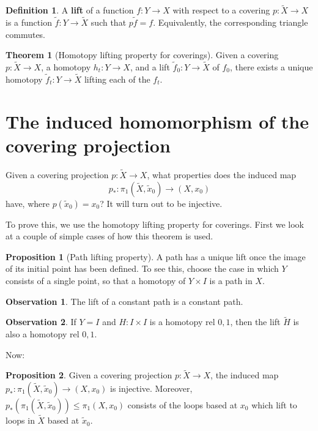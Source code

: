 \documentclass{book}
\theoremstyle{definition}
\newtheorem*{defn}{Definition}
\newtheorem*{obs}{Observation}
\newtheorem*{teo}{Theorem}
\newtheorem*{prop}{Proposition}
\begin{document}
\begin{defn}
A \textbf{lift} of a function $f:Y\to X$ with respect to a
covering $p:\tilde X\to X$ is a function
$\tilde f:Y\to\tilde X$ such that $p\tilde f=f$.
Equivalently, the corresponding triangle commutes.
\end{defn}

\begin{teo}[Homotopy lifting property for coverings]
\label{teo-lhc}
Given a covering $p:\tilde X\to X$, a homotopy
$h_t:Y\to X$, and a lift $\tilde f_0:Y\to\tilde X$ of
$f_0$, there exists a unique homotopy
$\tilde f_t:Y\to\tilde X$ lifting each of the $f_t$.
\end{teo}

\section{The induced homomorphism of the covering projection}

Given a covering projection $p:\tilde X\to X$, what
properties does the induced map
$$
p_*:\pi_1(\tilde X,\tilde x_0)\to (X,x_0)
$$
have, where $p(\tilde x_0)=x_0$? It will turn out to be
injective.

To prove this, we use the homotopy lifting property for
coverings. First we look at a couple of simple cases of how
this theorem is used.

\begin{prop}[Path lifting property]
A path has a unique lift once the image of its initial point
has been defined. To see this, choose the case in which $Y$
consists of a single point, so that a homotopy of
$Y\times I$ is a path in $X$.
\end{prop}

\begin{obs}
The lift of a constant path is a constant path.
\end{obs}

\begin{obs}
If $Y=I$ and $H:I\times I$ is a homotopy rel $0,1$, then the
lift $\tilde H$ is also a homotopy rel $0,1$.
\end{obs}

Now:

\begin{prop}
Given a covering projection $p:\tilde X\to X$, the induced
map $p_*:\pi_1(\tilde X,\tilde x_0)\to (X,x_0)$ is
injective. Moreover,
$p_*(\pi_1(\tilde X,\tilde x_0))\leq\pi_1(X,x_0)$ consists
of the loops based at $x_0$ which lift to loops in
$\tilde X$ based at $\tilde x_0$.
\end{prop}
\end{document}

